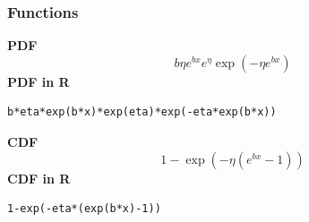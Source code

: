 \subsubsection*{Functions}

\smallskip \noindent \hspace{.2cm} \textbf{PDF} 
\begin{equation*}b\eta e^{bx}e^{\eta}\exp\left(-\eta e^{bx} \right)\end{equation*}
\smallskip \noindent \hspace{.2cm} \textbf{PDF in R}  
\begin{verbatim}b*eta*exp(b*x)*exp(eta)*exp(-eta*exp(b*x))\end{verbatim}
\smallskip \noindent \hspace{.2cm} \textbf{CDF} 
\begin{equation*}1-\exp\left(-\eta\left(e^{bx}-1 \right)\right)\end{equation*}
\smallskip \noindent \hspace{.2cm} \textbf{CDF in R}  
\begin{verbatim}1-exp(-eta*(exp(b*x)-1))\end{verbatim}
%
%
% 
%
%
%
